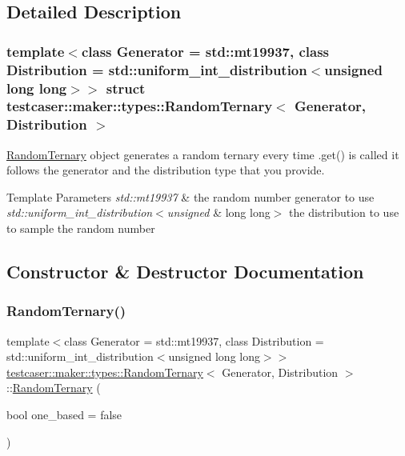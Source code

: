 \subsection{Detailed Description}
\subsubsection*{template$<$class Generator = std\+::mt19937, class Distribution = std\+::uniform\+\_\+int\+\_\+distribution$<$unsigned long long$>$$>$\newline
struct testcaser\+::maker\+::types\+::\+Random\+Ternary$<$ Generator, Distribution $>$}

\hyperlink{structtestcaser_1_1maker_1_1types_1_1RandomTernary}{Random\+Ternary} object generates a random ternary every time .get() is called it follows the generator and the distribution type that you provide. 


\begin{DoxyTemplParams}{Template Parameters}
{\em std\+::mt19937} & the random number generator to use \\
\hline
{\em std\+::uniform\+\_\+int\+\_\+distribution$<$unsigned} & long long$>$ the distribution to use to sample the random number \\
\hline
\end{DoxyTemplParams}


\subsection{Constructor \& Destructor Documentation}
\mbox{\label{structtestcaser_1_1maker_1_1types_1_1RandomTernary_a5c6ffde5294c4e0f4e252772a48bd7fe}} 
\subsubsection{\texorpdfstring{Random\+Ternary()}{RandomTernary()}}
{\footnotesize\ttfamily template$<$class Generator = std\+::mt19937, class Distribution = std\+::uniform\+\_\+int\+\_\+distribution$<$unsigned long long$>$$>$ \\
\hyperlink{structtestcaser_1_1maker_1_1types_1_1RandomTernary}{testcaser\+::maker\+::types\+::\+Random\+Ternary}$<$ Generator, Distribution $>$\+::\hyperlink{structtestcaser_1_1maker_1_1types_1_1RandomTernary}{Random\+Ternary} (\begin{DoxyParamCaption}\item[{bool}]{one\+\_\+based = {\ttfamily false} }\end{DoxyParamCaption})\hspace{0.3cm}{\ttfamily [inline]}}



